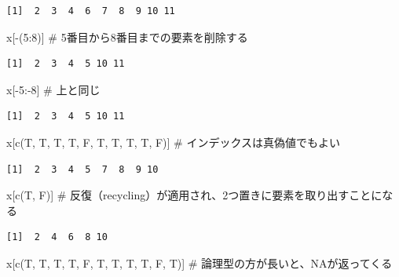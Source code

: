 \documentclass[
  letterpaper,
  DIV=11,
  numbers=noendperiod]{scrreprt}
\newenvironment{Shaded}{\begin{snugshade}}{\end{snugshade}}
\newcommand{\CommentTok}[1]{\textcolor[rgb]{0.37,0.37,0.37}{#1}}
\newcommand{\DecValTok}[1]{\textcolor[rgb]{0.68,0.00,0.00}{#1}}
\newcommand{\FunctionTok}[1]{\textcolor[rgb]{0.28,0.35,0.67}{#1}}
\newcommand{\NormalTok}[1]{\textcolor[rgb]{0.00,0.23,0.31}{#1}}
\newcommand{\SpecialCharTok}[1]{\textcolor[rgb]{0.37,0.37,0.37}{#1}}
\begin{document}
\begin{verbatim}
[1]  2  3  4  6  7  8  9 10 11
\end{verbatim}

\begin{Shaded}
\begin{Highlighting}[]
\NormalTok{x[}\SpecialCharTok{{-}}\NormalTok{(}\DecValTok{5}\SpecialCharTok{:}\DecValTok{8}\NormalTok{)] }\CommentTok{\# 5番目から8番目までの要素を削除する}
\end{Highlighting}
\end{Shaded}

\begin{verbatim}
[1]  2  3  4  5 10 11
\end{verbatim}

\begin{Shaded}
\begin{Highlighting}[]
\NormalTok{x[}\SpecialCharTok{{-}}\DecValTok{5}\SpecialCharTok{:{-}}\DecValTok{8}\NormalTok{] }\CommentTok{\# 上と同じ}
\end{Highlighting}
\end{Shaded}

\begin{verbatim}
[1]  2  3  4  5 10 11
\end{verbatim}

\begin{Shaded}
\begin{Highlighting}[]
\NormalTok{x[}\FunctionTok{c}\NormalTok{(T, T, T, T, F, T, T, T, T, F)] }\CommentTok{\# インデックスは真偽値でもよい}
\end{Highlighting}
\end{Shaded}

\begin{verbatim}
[1]  2  3  4  5  7  8  9 10
\end{verbatim}

\begin{Shaded}
\begin{Highlighting}[]
\NormalTok{x[}\FunctionTok{c}\NormalTok{(T, F)] }\CommentTok{\# 反復（recycling）が適用され、2つ置きに要素を取り出すことになる}
\end{Highlighting}
\end{Shaded}

\begin{verbatim}
[1]  2  4  6  8 10
\end{verbatim}

\begin{Shaded}
\begin{Highlighting}[]
\NormalTok{x[}\FunctionTok{c}\NormalTok{(T, T, T, T, F, T, T, T, T, F, T)] }\CommentTok{\# 論理型の方が長いと、NAが返ってくる}
\end{Highlighting}
\end{Shaded}
\end{document}
